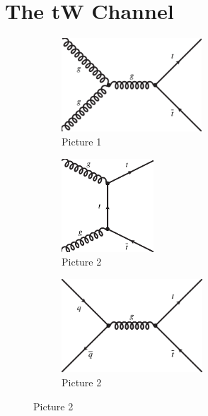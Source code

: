 \chapter{The tW Channel}
\label{chp:tw}

\begin{figure}
  \begin{subfigure}[b]{0.3\textwidth}
  	\centering
    \includegraphics[height=3.5cm]{figures_SM/ttbar_ttbar_1-BW}
    \caption{Picture 1}
    \label{fig:1}
  \end{subfigure}
  \hfill
  \begin{subfigure}[b]{0.3\textwidth}
  	\centering
    \includegraphics[height=3.5cm]{figures_SM/ttbar_ttbar_2-BW}
    \caption{Picture 2}
    \label{fig:2}
  \end{subfigure}
  \hfill
  \begin{subfigure}[b]{0.3\textwidth}
  	\centering
    \includegraphics[height=3.5cm]{figures_SM/ttbar_ttbar_3-BW}
    \caption{Picture 2}
    \label{fig:2}
  \end{subfigure}  
\end{figure}